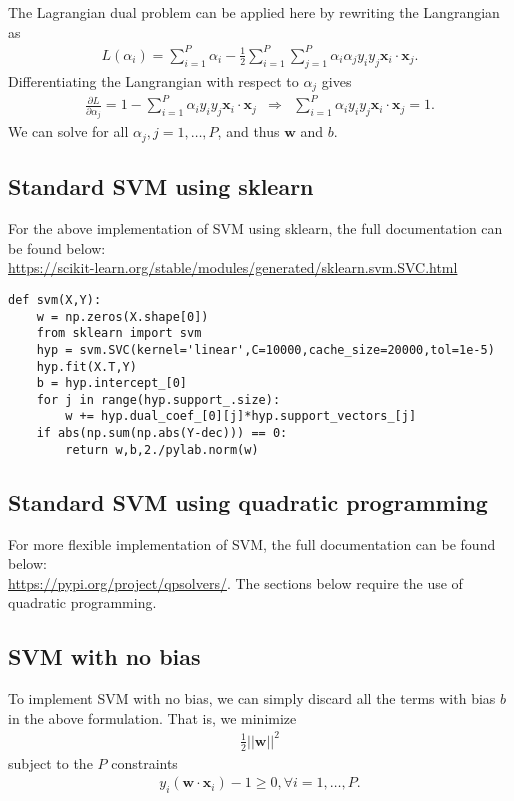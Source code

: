 \documentclass[11pt]{article}
\renewcommand{\[}{\begin{equation}}
\renewcommand{\]}{\end{equation}}
\begin{document}
The Lagrangian dual problem can be applied here by rewriting the Langrangian as
\begin{eqnarray}
L(\alpha_i) = \sum_{i=1}^{P}\alpha_i-\frac{1}{2}\sum_{i=1}^{P}\sum_{j=1}^{P}\alpha_i\alpha_jy_iy_j\textbf{x}_i\cdot\textbf{x}_j.
\end{eqnarray}
Differentiating the Langrangian with respect to $\alpha_j$ gives
\begin{eqnarray}
\frac{\partial L}{\partial \alpha_j} = 1 - \sum_{i=1}^{P}\alpha_iy_iy_j\textbf{x}_i\cdot\textbf{x}_j &\Rightarrow& \sum_{i=1}^{P}\alpha_iy_iy_j\textbf{x}_i\cdot\textbf{x}_j = 1.
\end{eqnarray}
We can solve for all $\alpha_j, j=1,\ldots,P$, and thus $\textbf{w}$ and $b$.
\subsection*{Standard SVM using sklearn}
For the above implementation of SVM using sklearn, the full documentation can be found below:\\
\href{https://scikit-learn.org/stable/modules/generated/sklearn.svm.SVC.html}{https://scikit-learn.org/stable/modules/generated/sklearn.svm.SVC.html}
\\
\begin{lstlisting}
def svm(X,Y):
	w = np.zeros(X.shape[0])
	from sklearn import svm
	hyp = svm.SVC(kernel='linear',C=10000,cache_size=20000,tol=1e-5)
	hyp.fit(X.T,Y)
	b = hyp.intercept_[0]
	for j in range(hyp.support_.size):
		w += hyp.dual_coef_[0][j]*hyp.support_vectors_[j]
	if abs(np.sum(np.abs(Y-dec))) == 0:
		return w,b,2./pylab.norm(w)
\end{lstlisting}
\subsection*{Standard SVM using quadratic programming}
For more flexible implementation of SVM, the full documentation can be found below:\\
\href{https://pypi.org/project/qpsolvers/}{https://pypi.org/project/qpsolvers/}.
The sections below require the use of quadratic programming.

\subsection*{SVM with no bias}
To implement SVM with no bias, we can simply discard all the terms with bias $b$ in the above formulation. That is, we minimize 
\begin{eqnarray}
\frac{1}{2}||\textbf{w}||^2
\end{eqnarray}
subject to the $P$ constraints
\begin{eqnarray}
y_i(\textbf{w}\cdot\textbf{x}_i) - 1 \geq 0, \forall i=1,\ldots,P.
\end{eqnarray}
\end{document}
